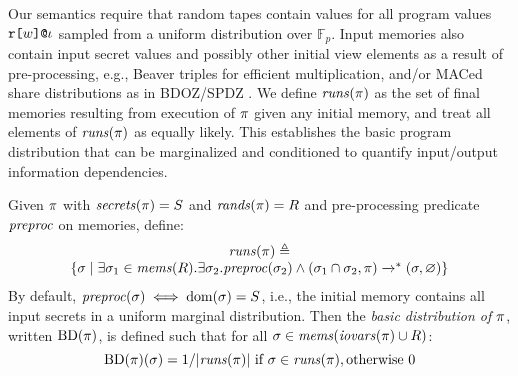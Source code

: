 Our semantics require that random tapes contain values for all program
values $\texttt{r[}w\texttt{]}\texttt{@}\iota$ sampled from a uniform distribution
over $\mathbb{F}_p$. Input memories also contain input secret values
and possibly other initial view elements as a result of
pre-processing, e.g., Beaver triples for efficient multiplication,
and/or MACed share distributions as in BDOZ/SPDZ
\cite{evans2018pragmatic,10.1007/978-3-030-68869-1_3}. We define
$\mathit{runs}(\pi)$ as the set of final memories resulting from execution
of $\pi$ given any initial memory, and treat all elements of
$\mathit{runs}(\pi)$ as equally likely.  This establishes the basic program
distribution that can be marginalized and conditioned to quantify
input/output information dependencies.
\begin{definition}
  \label{def-progtt}
  \label{def-progd}
  \label{definition-progd}
  Given $\pi$ with $\mathit{secrets}(\pi) = S$ and $\mathit{rands}(\pi) = R$ and
  pre-processing predicate $\mathit{preproc}$ on memories, define:
  $$
  \begin{array}{c}
    \mathit{runs}(\pi) \triangleq \\
    \{ \sigma \mid \exists \sigma_1 \in \mathit{mems}(R) . 
    \exists \sigma_2 . \mathit{preproc}(\sigma_2) \wedge
    (\sigma_1 \cap \sigma_2,\pi) \xrightarrow{}^{*} (\sigma,\varnothing) \}
  \end{array}
  $$
  By default, $\mathit{preproc}(\sigma) \iff \mathrm{dom}(\sigma) = S$, i.e.,
  the initial memory contains all input secrets in a uniform
  marginal distribution. Then the \emph{basic distribution of $\pi$}, written $\mathrm{BD}(\pi)$, is
  defined such that for all $\sigma \in \mathit{mems}(\mathit{iovars}(\pi) \cup R)$:
  $$
  \mathrm{BD}(\pi)(\sigma) =  1 / |\mathit{runs}(\pi)| \ \text{if}\ \sigma \in \mathit{runs}(\pi), \text{otherwise}\ 0
  $$
  
\end{definition}


